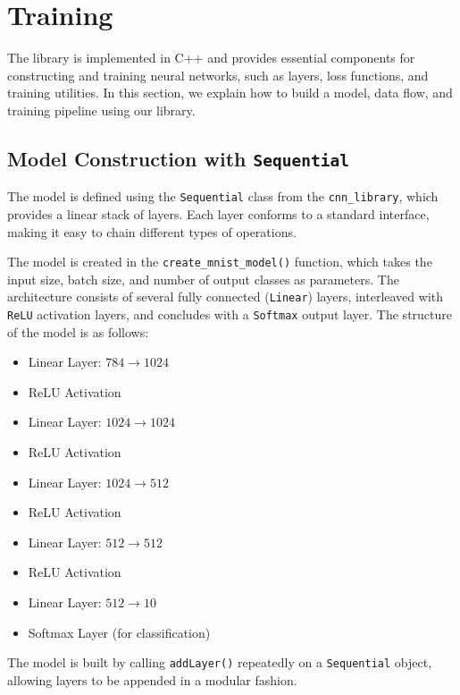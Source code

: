 \section{Training}

The library is implemented in C++ and provides essential components for constructing and training neural networks, such as layers, loss functions, and training utilities. In this section, we explain how to build a model, data flow, and training pipeline using our library.

\subsection{Model Construction with \texttt{Sequential}}

The model is defined using the \texttt{Sequential} class from the \texttt{cnn\_library}, which provides a linear stack of layers. Each layer conforms to a standard interface, making it easy to chain different types of operations.

The model is created in the \texttt{create\_mnist\_model()} function, which takes the input size, batch size, and number of output classes as parameters. The architecture consists of several fully connected (\texttt{Linear}) layers, interleaved with \texttt{ReLU} activation layers, and concludes with a \texttt{Softmax} output layer. The structure of the model is as follows:

\begin{itemize}
    \item Linear Layer: $784 \rightarrow 1024$
    \item ReLU Activation
    \item Linear Layer: $1024 \rightarrow 1024$
    \item ReLU Activation
    \item Linear Layer: $1024 \rightarrow 512$
    \item ReLU Activation
    \item Linear Layer: $512 \rightarrow 512$
    \item ReLU Activation
    \item Linear Layer: $512 \rightarrow 10$
    \item Softmax Layer (for classification)
\end{itemize}

The model is built by calling \texttt{addLayer()} repeatedly on a \texttt{Sequential} object, allowing layers to be appended in a modular fashion.

